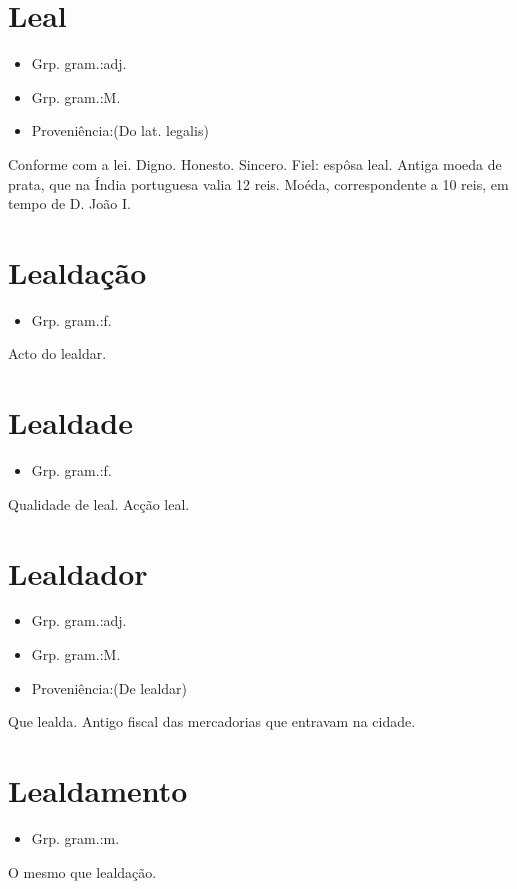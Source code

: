 \section{Leal}
\begin{itemize}
\item {Grp. gram.:adj.}
\end{itemize}
\begin{itemize}
\item {Grp. gram.:M.}
\end{itemize}
\begin{itemize}
\item {Proveniência:(Do lat. \textunderscore legalis\textunderscore )}
\end{itemize}
Conforme com a lei.
Digno.
Honesto.
Sincero.
Fiel: \textunderscore espôsa leal\textunderscore .
Antiga moeda de prata, que na Índia portuguesa valia 12 reis.
Moéda, correspondente a 10 reis, em tempo de D. João I.
\section{Lealdação}
\begin{itemize}
\item {Grp. gram.:f.}
\end{itemize}
Acto do lealdar.
\section{Lealdade}
\begin{itemize}
\item {Grp. gram.:f.}
\end{itemize}
Qualidade de leal.
Acção leal.
\section{Lealdador}
\begin{itemize}
\item {Grp. gram.:adj.}
\end{itemize}
\begin{itemize}
\item {Grp. gram.:M.}
\end{itemize}
\begin{itemize}
\item {Proveniência:(De \textunderscore lealdar\textunderscore )}
\end{itemize}
Que lealda.
Antigo fiscal das mercadorias que entravam na cidade.
\section{Lealdamento}
\begin{itemize}
\item {Grp. gram.:m.}
\end{itemize}
O mesmo que \textunderscore lealdação\textunderscore .
